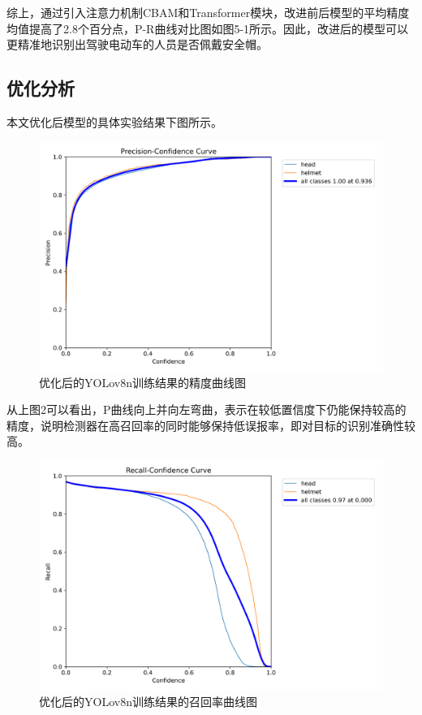 \documentclass[journal]{IEEEtran}
\numberwithin{figure}{section}%
\numberwithin{table}{section}%
\numberwithin{equation}{section}
\begin{document}
综上，通过引入注意力机制CBAM和Transformer模块，改进前后模型的平均精度均值提高了2.8个百分点，P-R曲线对比图如图5-1所示。因此，改进后的模型可以更精准地识别出驾驶电动车的人员是否佩戴安全帽。
\subsection{优化分析}
本文优化后模型的具体实验结果下图所示。\par

\begin{figure}
	\centering
	\includegraphics[scale=0.4]{./figures/5_4.png}
	\caption{优化后的YOLov8n训练结果的精度曲线图}
	\label{fig:11}
  \end{figure}
\setcounter{equation}{0}

从上图2可以看出，P曲线向上并向左弯曲，表示在较低置信度下仍能保持较高的精度，说明检测器在高召回率的同时能够保持低误报率，即对目标的识别准确性较高。\par

\begin{figure}[H]
	\centering
	\includegraphics[scale=0.4]{./figures/5_5.png}
	\caption{优化后的YOLov8n训练结果的召回率曲线图}
	\label{fig:12}
  \end{figure}
\end{document}
